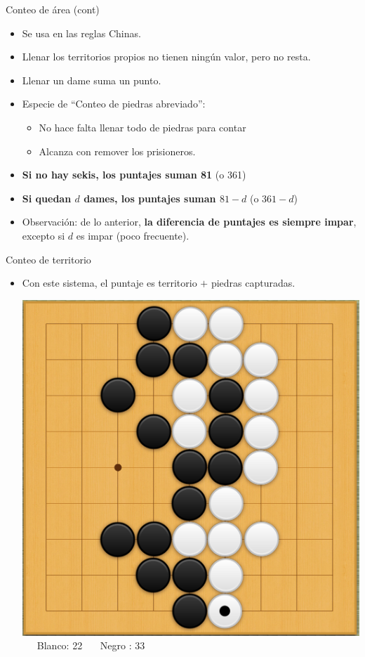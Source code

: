 \documentclass{beamer}
\begin{document}
\begin{frame}{Conteo de área (cont)}
  
  \begin{itemize}
    \item Se usa en las reglas Chinas.
    \item Llenar los territorios propios no tienen ningún valor, pero no resta.
    \item Llenar un dame suma un punto.
    \item Especie de ``Conteo de piedras abreviado'': 
       \begin{itemize}
           \item No hace falta llenar todo de piedras para contar
           \item Alcanza con remover los prisioneros.
       \end{itemize}
    \item \textbf{Si no hay sekis, los puntajes suman 81} (o 361)
    \item \textbf{Si quedan $d$ dames,  los puntajes suman $81 - d$} (o $361 - d$)
    \item Observación: de lo anterior, \textbf{la diferencia de puntajes es siempre impar}, excepto si $d$ es impar (poco frecuente).
  \end{itemize}
  
\end{frame}

\begin{frame}{Conteo de territorio}
  
  \begin{itemize}
    \item Con este sistema, el puntaje es territorio $+$ piedras capturadas.
    
    \includegraphics[scale=0.17]{ejemplo-conteo.png} \ \ \ Blanco: 22 \ \ \ Negro : 33  
  \end{itemize}
  
\end{frame}
\end{document}
